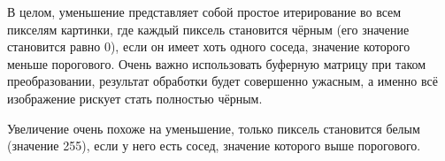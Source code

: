 В целом, уменьшение представляет собой простое итерирование во всем пикселям картинки, где каждый пиксель становится чёрным (его значение становится равно 0), если он имеет хоть одного соседа, значение которого меньше порогового.
Очень важно использовать буферную матрицу при таком преобразовании, результат обработки будет совершенно ужасным, а именно всё изображение рискует стать полностью чёрным.

Увеличение очень похоже на уменьшение, только пиксель становится белым (значение 255), если у него есть сосед, значение которого выше порогового.